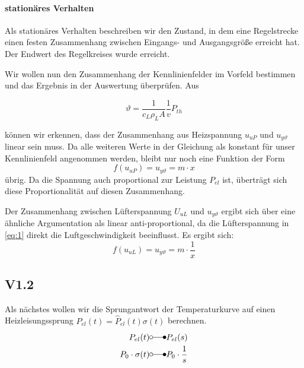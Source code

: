 \documentclass{report}
\begin{document}
\paragraph{stationäres Verhalten} Als stationäres Verhalten beschreiben wir den Zustand, in dem eine Regelstrecke einen festen Zusammenhang zwischen Eingangs- und Ausgangsgröße erreicht hat. Der Endwert des Regelkreises wurde erreicht.


\vspace{1emy}
\noindent
Wir wollen nun den Zusammenhang der Kennlinienfelder im Vorfeld bestimmen und das Ergebnis in der Auswertung überprüfen. Aus

\begin{equation}
  \label{eq:1}
  \vartheta = \frac{1}{c_{L}\rho_{L}A}\frac{1}{v}P_{th}
\end{equation}

können wir erkennen, dass der Zusammenhang aus Heizspannung $u_{uP}$ und $u_{y\vartheta}$ linear sein muss. Da alle weiteren Werte in der Gleichung als konstant für unser Kennlinienfeld angenommen werden, bleibt nur noch eine Funktion der Form
\begin{equation}
  \label{eq:2}
  f(u_{uP}) = u_{y\vartheta} = m\cdot x
\end{equation}
übrig. Da die Spannung auch proportional zur Leistung $P_{el}$ ist, überträgt sich diese Proportionalität auf diesen Zusammenhang.

Der Zusammenhang zwischen Lüfterspannung $U_{uL}$ und $u_{y\vartheta}$ ergibt sich über eine ähnliche Argumentation als linear anti-proportional, da die Lüfterspannung in \ref{eq:1} direkt die Luftgeschwindigkeit beeinflusst. Es ergibt sich:
\begin{equation}
  \label{eq:3}
  f(u_{uL}) = u_{y\vartheta} = m\cdot \frac{1}{x}
\end{equation}

\subsection{V1.2}

Als nächstes wollen wir die Sprungantwort der Temperaturkurve auf einen Heizleisungssprung $P_{el}(t) = \hat{P}_{el}(t)\sigma(t)$ berechnen.
\begin{align}
  P_{el}(t) &\laplace P_{el}(s)\\
  P_{0}\cdot \sigma(t) &\laplace P_{0}\cdot \frac{1}{s}\\
\end{align}
\end{document}
